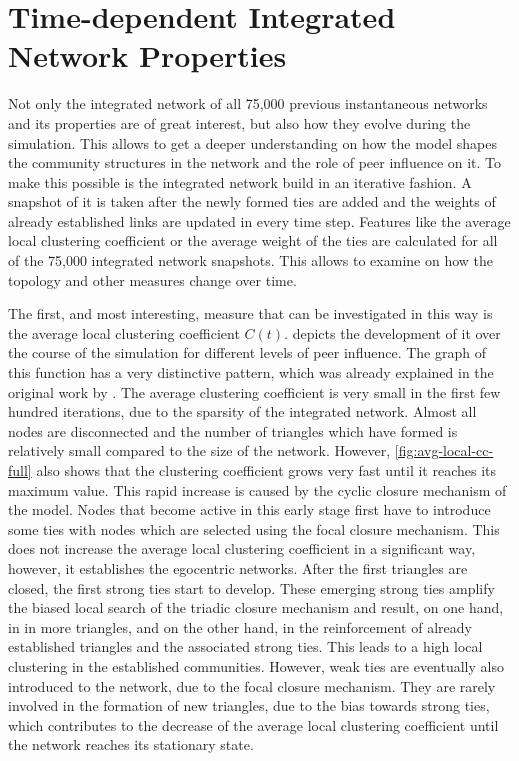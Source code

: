 

\section{Time-dependent Integrated Network Properties}
\label{sec:integrated-network-properties}

Not only the integrated network of all 75,000 previous instantaneous networks and its properties are of great interest, but also how they evolve during the simulation.
This allows to get a deeper understanding on how the model shapes the community structures in the network and the role of peer influence on it.
To make this possible is the integrated network build in an iterative fashion.
A snapshot of it is taken after the newly formed ties are added and the weights of already established links are updated in every time step.
Features like the average local clustering coefficient or the average weight of the ties are calculated for all of the 75,000 integrated network snapshots.
This allows to examine on how the topology and other measures change over time.

The first, and most interesting, measure that can be investigated in this way is the average local clustering coefficient \( C(t) \).
 depicts the development of it over the course of the simulation for different levels of peer influence.
The graph of this function has a very distinctive pattern, which was already explained in the original work by \citet{Laurent2015}.
The average clustering coefficient is very small in the first few hundred iterations, due to the sparsity of the integrated network.
Almost all nodes are disconnected and the number of triangles which have formed is relatively small compared to the size of the network.
However, \cref{fig:avg-local-cc-full} also shows that the clustering coefficient grows very fast until it reaches its maximum value.
This rapid increase is caused by the cyclic closure mechanism of the model.
Nodes that become active in this early stage first have to introduce some ties with nodes which are selected using the focal closure mechanism.
This does not increase the average local clustering coefficient in a significant way, however, it establishes the egocentric networks.
After the first triangles are closed, the first strong ties start to develop.
These emerging strong ties amplify the biased local search of the triadic closure mechanism and result, on one hand, in in more triangles, and on the other hand, in the reinforcement of already established triangles and the associated strong ties.
This leads to a high local clustering in the established communities.
However, weak ties are eventually also introduced to the network, due to the focal closure mechanism.
They are rarely involved in the formation of new triangles, due to the bias towards strong ties, which contributes to the decrease of the average local clustering coefficient until the network reaches its stationary state.


